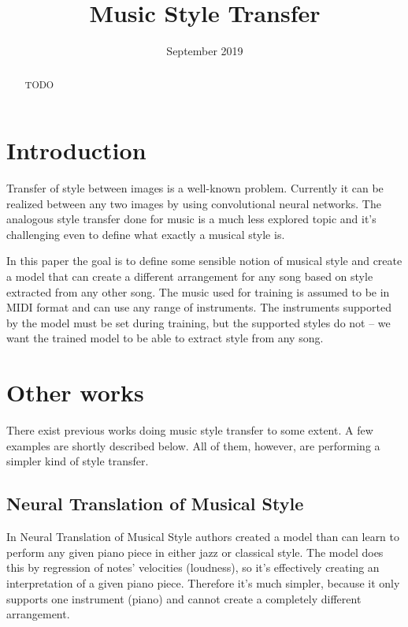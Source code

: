 \documentclass[en]{pracamgr}
\title{Music Style Transfer}
\date{September 2019}
\begin{document}
\maketitle

\begin{abstract}
  TODO
\end{abstract}

\tableofcontents

\chapter{Introduction}

Transfer of style between images is a well-known problem.
Currently it can be realized between any two images by using convolutional neural networks.
The analogous style transfer done for music is a much less explored topic and it's challenging even to define what exactly a musical style is.

In this paper the goal is to define some sensible notion of musical style and create a model that can create a different arrangement for any song based on style extracted from any other song.
The music used for training is assumed to be in MIDI format and can use any range of instruments.
The instruments supported by the model must be set during training, but the supported styles do not -- we want the trained model to be able to extract style from any song.

\chapter{Other works}

There exist previous works doing music style transfer to some extent.
A few examples are shortly described below.
All of them, however, are performing a simpler kind of style transfer.

\section{Neural Translation of Musical Style}

In Neural Translation of Musical Style \cite{neural_translation} authors created a model than can learn to perform any given piano piece in either jazz or classical style.
The model does this by regression of notes' velocities (loudness), so it's effectively creating an interpretation of a given piano piece.
Therefore it's much simpler, because it only supports one instrument (piano) and cannot create a completely different arrangement.
\end{document}
